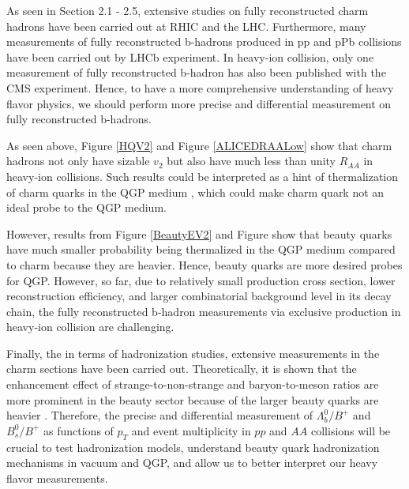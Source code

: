 As seen in Section 2.1 - 2.5, extensive studies on fully reconstructed charm hadrons have been carried out at RHIC and the LHC. Furthermore, many measurements of fully reconstructed b-hadrons produced in pp and pPb collisions have been carried out by LHCb experiment. In heavy-ion collision, only one measurement of fully reconstructed b-hadron has also been published with the CMS experiment. Hence, to have a more comprehensive understanding of heavy flavor physics, we should perform more precise and differential measurement on fully reconstructed b-hadrons. 


As seen above, Figure \ref{HQV2} and Figure \ref{ALICEDRAALow} show that charm hadrons not only have sizable $v_2$ but also have much less than unity $R_{AA}$ in heavy-ion collisions. Such results could be interpreted as a hint of thermalization of charm quarks in the QGP medium \cite{CharmThermal}, which could make charm quark not an ideal probe to the QGP medium. 

However, results from Figure \ref{BeautyEV2} and Figure \cite{BsBP2015} show that beauty quarks have much smaller probability being thermalized in the QGP medium compared to charm because they are heavier. Hence, beauty quarks are more desired probes for QGP. However, so far, due to relatively small production cross section, lower reconstruction efficiency, and larger combinatorial background level in its decay chain, the fully reconstructed b-hadron measurements via exclusive production in heavy-ion collision are challenging.

Finally, the in terms of hadronization studies, extensive measurements in the charm sections have been carried out. Theoretically, it is shown that the enhancement effect of strange-to-non-strange and baryon-to-meson ratios are more prominent in the beauty sector because of the larger beauty quarks are heavier \cite{BaryontoMeson}. Therefore, the precise and differential measurement of $\Lambda_b^0/B^+$ and $B^0_s/B^+$ as functions of $p_T$ and event multiplicity in $pp$ and $AA$ collisions will be crucial to test hadronization models, understand beauty quark hadronization mechanisms in vacuum and QGP, and allow us to better interpret our heavy flavor measurements.

